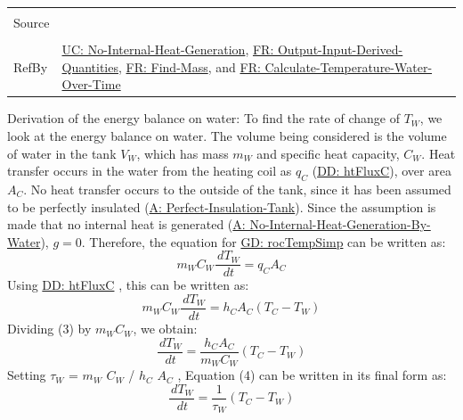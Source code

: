 \documentclass[12pt]{article}
\begin{document}
\begin{minipage}{\textwidth}
\begin{tabular}{>{\raggedright}p{}>{\raggedright\arraybackslash}p{}}
\\ \midrule \\
Source & \cite[(with PCM removed)]{koothoor2013}
\\ \midrule \\
RefBy & \hyperref[unlikeChgNIHG]{UC: No-Internal-Heat-Generation}, \hyperref[outputInputDerivQuants]{FR: Output-Input-Derived-Quantities}, \hyperref[findMass]{FR: Find-Mass}, and \hyperref[calcTempWtrOverTime]{FR: Calculate-Temperature-Water-Over-Time}
\\ \bottomrule \end{tabular}
\end{minipage}
Derivation of the energy balance on water:
To find the rate of change of ${T_{W}}$, we look at the energy balance on water. The volume being considered is the volume of water in the tank ${V_{W}}$, which has mass ${m_{W}}$ and specific heat capacity, ${C_{W}}$. Heat transfer occurs in the water from the heating coil as ${q_{C}}$ (\hyperref[DD:htFluxC]{DD: htFluxC}), over area ${A_{C}}$. No heat transfer occurs to the outside of the tank, since it has been assumed to be perfectly insulated (\hyperref[assumpPIT]{A: Perfect-Insulation-Tank}). Since the assumption is made that no internal heat is generated (\hyperref[assumpNIHGBW]{A: No-Internal-Heat-Generation-By-Water}), $g=0$. Therefore, the equation for \hyperref[GD:rocTempSimp]{GD: rocTempSimp} can be written as:
\begin{displaymath}
{m_{W}} {C_{W}} \frac{\,d{T_{W}}}{\,dt}={q_{C}} {A_{C}}
\end{displaymath}
Using \hyperref[DD:htFluxC]{DD: htFluxC} , this can be written as:
\begin{displaymath}
{m_{W}} {C_{W}} \frac{\,d{T_{W}}}{\,dt}={h_{C}} {A_{C}} \left({T_{C}}-{T_{W}}\right)
\end{displaymath}
Dividing (3) by ${m_{W}} {C_{W}}$, we obtain:
\begin{displaymath}
\frac{\,d{T_{W}}}{\,dt}=\frac{{h_{C}} {A_{C}}}{{m_{W}} {C_{W}}} \left({T_{C}}-{T_{W}}\right)
\end{displaymath}
Setting ${τ_{W}}$ = ${m_{W}}$ ${C_{W}}$ / ${h_{C}}$ ${A_{C}}$ , Equation (4) can be written in its final form as:
\begin{displaymath}
\frac{\,d{T_{W}}}{\,dt}=\frac{1}{{τ_{W}}} \left({T_{C}}-{T_{W}}\right)
\end{displaymath}
\par~
\end{document}
